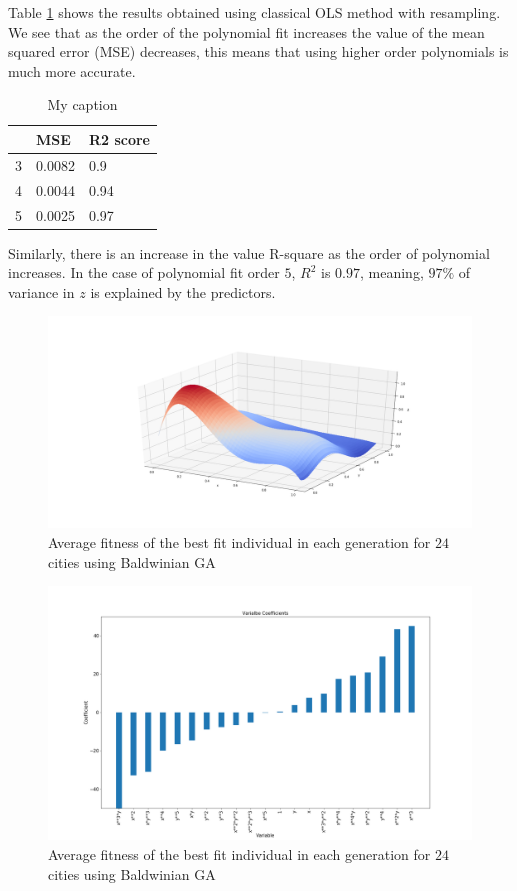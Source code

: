 \documentclass [11pt]{article}
\begin{document}
Table \ref{tab:olsFranke} shows the results obtained using classical OLS method with resampling. We see that as the order of the polynomial fit increases the value of  the mean squared error (MSE) decreases, this means that using higher order polynomials is much more accurate. 

\begin{table}[H]
\centering
\begin{tabular}{lll}
\hline
  & MSE    & R2 score \\ \hline
3 & 0.0082 & 0.9      \\
4 & 0.0044 & 0.94     \\
5 & 0.0025 & 0.97     \\ \hline
\end{tabular}%
\caption{My caption}
\label{tab:olsFranke}
\end{table}
Similarly, there is an increase in the value R-square as the order of polynomial increases. In the case of polynomial fit order $5$, $R^{2}$ is $0.97$, meaning, $97\%$ of variance in $z$ is explained by the predictors. 
\begin{figure}[H]
\centering
\includegraphics[width=1\textwidth]{figures/olsFranke.png}
        \caption{Average fitness of the best fit individual in each generation for $24$ cities using Baldwinian GA}
        \label{fig:olsFranke}
\end{figure}

\begin{figure}[H]
\centering
\includegraphics[width=1\textwidth]{figures/coeffOLS.png}
        \caption{Average fitness of the best fit individual in each generation for $24$ cities using Baldwinian GA}
        \label{fig:coeffOLS}
\end{figure}
\end{document}
